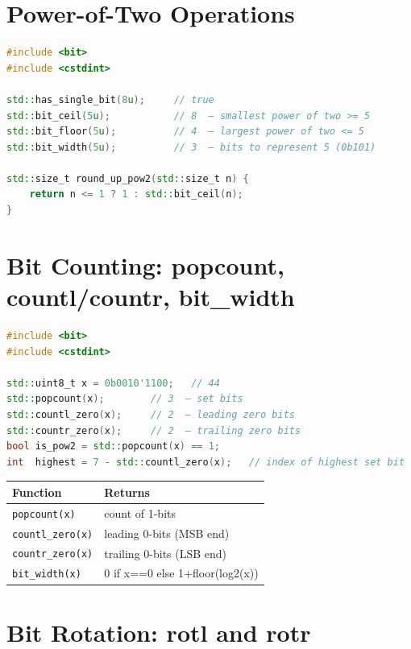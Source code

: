 \section{Power-of-Two Operations}
\label{sec:c20-bit-pow2}

\begin{lstlisting}[language=C++,caption={Power-of-two helpers}]
#include <bit>
#include <cstdint>

std::has_single_bit(8u);     // true
std::bit_ceil(5u);           // 8  — smallest power of two >= 5
std::bit_floor(5u);          // 4  — largest power of two <= 5
std::bit_width(5u);          // 3  — bits to represent 5 (0b101)

std::size_t round_up_pow2(std::size_t n) {
    return n <= 1 ? 1 : std::bit_ceil(n);
}
\end{lstlisting}

\section{Bit Counting: popcount, countl/countr, bit\_width}
\label{sec:c20-bit-count}

\begin{lstlisting}[language=C++,caption={The bit-counting catalogue}]
#include <bit>
#include <cstdint>

std::uint8_t x = 0b0010'1100;   // 44
std::popcount(x);        // 3  — set bits
std::countl_zero(x);     // 2  — leading zero bits
std::countr_zero(x);     // 2  — trailing zero bits
bool is_pow2 = std::popcount(x) == 1;
int  highest = 7 - std::countl_zero(x);   // index of highest set bit
\end{lstlisting}

\begin{center}
\begin{tabular}{ll}
\hline
\textbf{Function} & \textbf{Returns} \\
\hline
\texttt{popcount(x)} & count of 1-bits \\
\texttt{countl\_zero(x)} & leading 0-bits (MSB end) \\
\texttt{countr\_zero(x)} & trailing 0-bits (LSB end) \\
\texttt{bit\_width(x)} & 0 if x==0 else 1+floor(log2(x)) \\
\hline
\end{tabular}
\end{center}

\section{Bit Rotation: rotl and rotr}
\label{sec:c20-bit-rotate}

